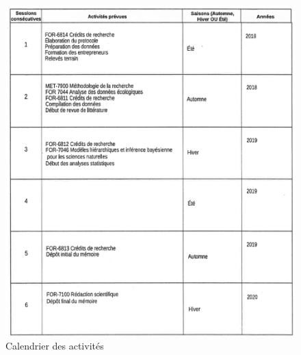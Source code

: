 \documentclass[letterpaper, 12pt]{article}
\begin{document}
\begin{figure}[H]
	\centering
	\includegraphics[width=15cm]{Calendrier}
	\caption{Calendrier des activités}
\end{figure}


\newpage

\nocite{*}


\end{document}
